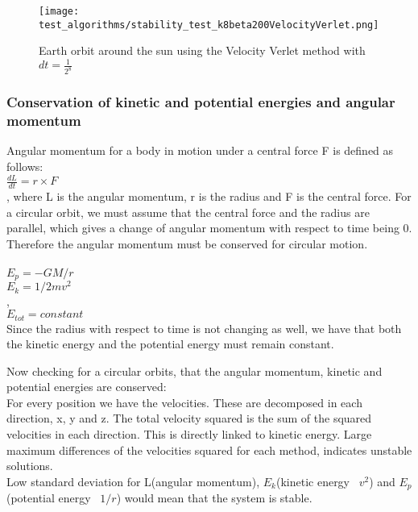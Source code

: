 \FloatBarrier
\begin{figure}[!ht]
\centering
\FloatBarrier
\texttt{[image: test\_algorithms/stability\_test\_k8beta200VelocityVerlet.png]}

\caption{Earth orbit around the sun using the Velocity Verlet method with $dt = \frac{1}{2^8}$}
\label{fig:Earth_orbit_sun_Forward_Euler_k_8}
\end{figure}
\FloatBarrier


\subsubsection{Conservation of kinetic and potential energies and angular momentum}
Angular momentum for a body in motion under a central force F is defined as follows:\\
$\frac{dL}{dt}=r \times F$\\
, where L is the angular momentum, r is the radius and F is the central force. For a circular orbit, we must assume that the central force and the radius are parallel, which gives a change of angular momentum with respect to time being 0. Therefore the angular momentum must be conserved for circular motion. \\
\\
$E_p = -GM/r$\\
$E_k = 1/2mv^2$\\,
\\
$E_{tot} = constant$\\

Since the radius with respect to time is not changing as well, we have that both the kinetic energy and the potential energy must remain constant.

Now checking for a circular orbits, that the angular momentum, kinetic and potential energies are conserved:\\

For every position we have the velocities. These are decomposed in each direction, x, y and z. The total velocity squared is the sum of the squared velocities in each direction. This is directly linked to kinetic energy. Large maximum differences of the velocities squared for each method, indicates unstable solutions.\\

Low standard deviation for L(angular momentum), $E_k$(kinetic energy ~$v^2$) and $E_p$(potential energy ~$1/r$) would mean that the system is stable. \\

